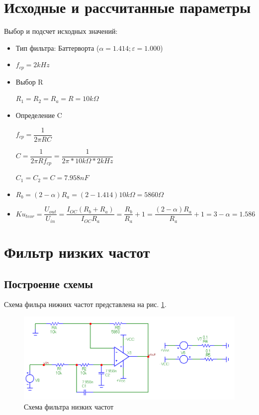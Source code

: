 \documentclass[a4paper,14pt]{article}
\begin{document}

\pagebreak
\section{Исходные и рассчитанные параметры}

Выбор и подсчет исходных значений:
\begin{itemize}

\item Тип фильтра: Баттерворта ($\alpha = 1.414; \varepsilon = 1.000$)

\item $f_{cp} = 2kHz$

\item Выбор R

$R_1 = R_2 = R_a = R = 10 k\Omega$

\item Определение C

$f_{cp} = \dfrac{1}{2\pi RC}$

$C = \dfrac{1}{2\pi Rf_{cp}} = \dfrac{1}{2\pi * 10k\Omega * 2kHz}$

$C_1 = C_2 = C = 7.958 nF$

\item $R_b = (2-\alpha)R_a = (2 - 1.414)10k\Omega = 5860 \Omega$

\item $Ku_{teor} = \dfrac{U_{out}}{U_{in}} = \dfrac{I_{OC}(R_b + R_a)}{I_{OC}R_a} = \dfrac{R_b}{R_a} + 1 = \dfrac{(2 - \alpha) R_a}{R_a} + 1 = 3 - \alpha = 1.586$
\end{itemize}

\section{Фильтр низких частот}

\subsection{Построение схемы}

Схема фильра нижних частот представлена на рис. \ref{fig:shfnch}.

\begin{figure}[H]
	\centering
	\includegraphics[width=0.85\linewidth]{../imgs/FNCH/sh_fnch}
	\caption{Схема фильтра низких частот}
	\label{fig:shfnch}
\end{figure}
\end{document}
